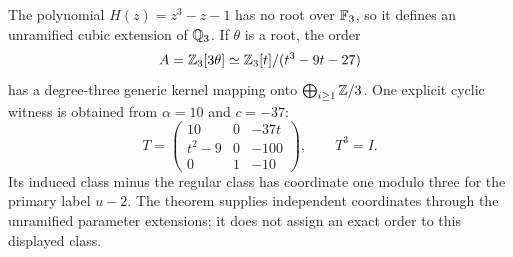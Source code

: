 \begin{example}\label{ex:unramified-cubic-order}
The polynomial $H(z)=z^3-z-1$ has no root over $\mathbb F_3$, so it defines
an unramified cubic extension of $\mathbb Q_3$.  If $\theta$ is a root, the
order
\[
 A=\mathbb Z_3[3\theta]
   \simeq\mathbb Z_3[t]/(t^3-9t-27)
\]
has a degree-three generic kernel mapping onto
$\bigoplus_{i\ge1}\mathbb Z/3$.  One explicit cyclic witness is obtained
from $\alpha=10$ and $c=-37$:
\[
 T=\begin{pmatrix}
       10&0&-37t\\
       t^2-9&0&-100\\
       0&1&-10
    \end{pmatrix},\qquad T^3=I.
\]
Its induced class minus the regular class has coordinate one modulo
three for the primary label $u-2$.  The theorem supplies independent
coordinates through the unramified parameter extensions; it does not
assign an exact order to this displayed class.
\end{example}
